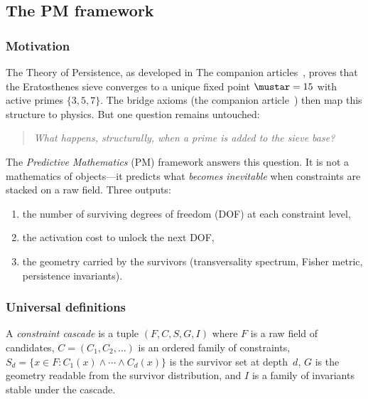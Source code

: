 \documentclass[12pt,a4paper]{article}
\begin{document}
\subsection{The PM framework}
\label{sec:PM_framework}

\subsubsection{Motivation}
\mTHM

The Theory of Persistence, as developed in The companion articles~\cite{companion_M1,companion_M2,companion_M3}, proves that the
Eratosthenes sieve converges to a unique fixed point $\mustar = 15$ with
active primes $\{3, 5, 7\}$.  The bridge axioms (the companion article~\cite{companion_M5}) then map this
structure to physics.  But one question remains untouched:

\begin{quote}
\emph{What happens, structurally, when a prime is added to the sieve base?}
\end{quote}

The \emph{Predictive Mathematics} (PM) framework answers this question.
It is not a mathematics of objects---it predicts what \emph{becomes
inevitable} when constraints are stacked on a raw field.  Three outputs:
\begin{enumerate}[nosep]
  \item the number of surviving degrees of freedom (DOF) at each constraint level,
  \item the activation cost to unlock the next DOF,
  \item the geometry carried by the survivors (transversality spectrum, Fisher
    metric, persistence invariants).
\end{enumerate}

\subsubsection{Universal definitions}
\label{sec:PM_defs}

\begin{definition}
\label{def:cascade}
A \emph{constraint cascade} is a tuple $(F, C, S, G, I)$ where
$F$ is a raw field of candidates,
$C = (C_1, C_2, \ldots)$ is an ordered family of constraints,
$S_d = \{x \in F : C_1(x) \wedge \cdots \wedge C_d(x)\}$ is the survivor set at depth~$d$,
$G$ is the geometry readable from the survivor distribution, and
$I$ is a family of invariants stable under the cascade.
\end{definition}
\end{document}

